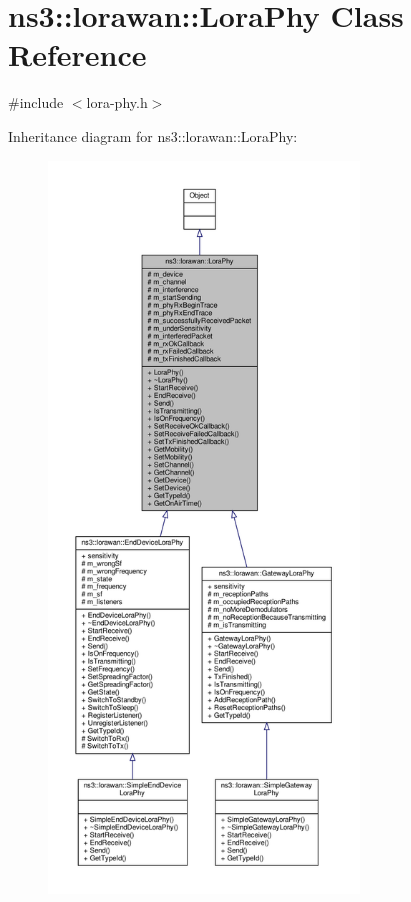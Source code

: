 \hypertarget{classns3_1_1lorawan_1_1LoraPhy}{}\section{ns3\+:\+:lorawan\+:\+:Lora\+Phy Class Reference}
\label{classns3_1_1lorawan_1_1LoraPhy}


{\ttfamily \#include $<$lora-\/phy.\+h$>$}



Inheritance diagram for ns3\+:\+:lorawan\+:\+:Lora\+Phy\+:
\nopagebreak
\begin{figure}[H]
\begin{center}
\leavevmode
\includegraphics[height=550pt]{classns3_1_1lorawan_1_1LoraPhy__inherit__graph}
\end{center}
\end{figure}



